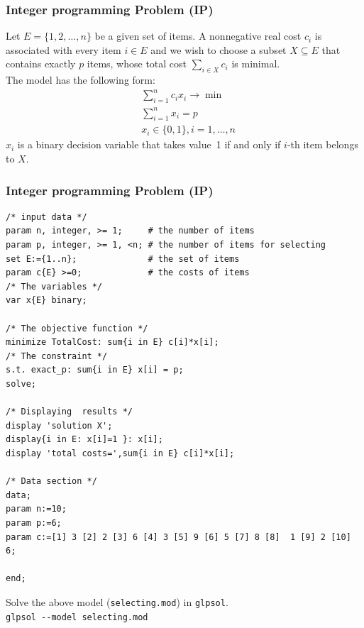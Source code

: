 \documentclass[landscape]{beamer}
\begin{document}
\begin{frame}[fragile]
  \frametitle{Integer programming Problem (IP)}
\begin{small}  
Let $E=\{1,2,\dots,n\}$ be a given set of items. A nonnegative real cost $c_i$ is associated with every item $i\in E$ and we wish to choose a subset $X\subseteq E$ that contains exactly $p$ items, whose total cost $\sum_{i\in X} c_i$ is minimal. \\
The model has the following form:
\begin{align*}
      &\sum_{i=1}^{n}c_i x_i\rightarrow \min\\
      &\sum_{i=1}^{n} x_i=p\\
      &x_i \in\{0,1\}, i=1,\ldots,n
\end{align*}
$x_i$ is a binary decision variable that takes value~1 if and only if  $i$-th item belongs to $X$.

\end{small}

\end{frame}

\begin{frame}[fragile]
  \frametitle{Integer programming Problem (IP)}
\begin{tiny}
\begin{verbatim}
/* input data */
param n, integer, >= 1;     # the number of items
param p, integer, >= 1, <n; # the number of items for selecting
set E:={1..n};              # the set of items
param c{E} >=0;             # the costs of items
/* The variables */ 
var x{E} binary;

/* The objective function */
minimize TotalCost: sum{i in E} c[i]*x[i];
/* The constraint */
s.t. exact_p: sum{i in E} x[i] = p; 
solve;

/* Displaying  results */
display 'solution X';
display{i in E: x[i]=1 }: x[i];
display 'total costs=',sum{i in E} c[i]*x[i];

/* Data section */
data;
param n:=10;
param p:=6;
param c:=[1] 3 [2] 2 [3] 6 [4] 3 [5] 9 [6] 5 [7] 8 [8]  1 [9] 2 [10] 6;

end;  
\end{verbatim}
\end{tiny}
\begin{small}
Solve the above model (\texttt{selecting.mod}) in \texttt{glpsol}.\\
\verb=glpsol --model selecting.mod=
\end{small}
\end{frame}
\end{document}
